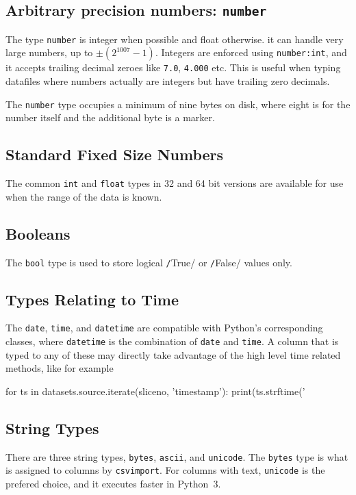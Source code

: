 \subsection{Arbitrary precision numbers:  \texttt{number}}
The type \texttt{number} is integer when possible and float otherwise.
it can handle very large numbers, up to $\pm (2^{1007}-1)$.  Integers
are enforced using \texttt{number:int}, and it accepts trailing
decimal zeroes like \texttt{7.0}, \texttt{4.000} etc.  This is useful
when typing datafiles where numbers actually are integers but have
trailing zero decimals.

The \texttt{number} type occupies a minimum of nine bytes on disk,
where eight is for the number itself and the additional byte is a
marker.


\subsection{Standard Fixed Size Numbers}
The common \texttt{int} and \texttt{float} types in 32 and 64 bit
versions are available for use when the range of the data is known.


\subsection{Booleans}
The \texttt{bool} type is used to store logical
\texttt/True/ or \texttt/False/ values only.


\subsection{Types Relating to Time}
The \texttt{date}, \texttt{time}, and \texttt{datetime} are compatible
with Python's corresponding classes, where \texttt{datetime} is the
combination of \texttt{date} and \texttt{time}.  A column that is
typed to any of these may directly take advantage of the high level
time related methods, like for example
\begin{python}
for ts in datasets.source.iterate(sliceno, 'timestamp'):
    print(ts.strftime('%
\end{python}


\subsection{String Types}
There are three string types, \texttt{bytes}, \texttt{ascii}, and
\texttt{unicode}.  The \texttt{bytes} type is what is assigned to
columns by \texttt{csvimport}.  For columns with text,
\texttt{unicode} is the prefered choice, and it executes faster in
Python~3.


